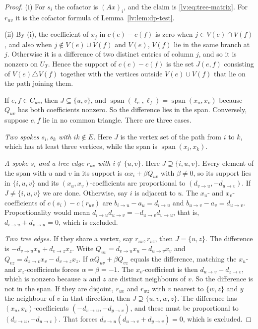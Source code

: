 \documentclass[11pt,a4paper]{article}
\theoremstyle{definition}
\theoremstyle{remark}
\begin{document}
\begin{proof}
(i) For $s_i$ the cofactor is $(Ax)_i$, and the claim is \eqref{lv:eq:tree-matrix}. For $r_{uv}$ it is the cofactor formula of Lemma~\ref{lv:lem:dp-test}.

(ii) By (i), the coefficient of $x_j$ in $c(e)-c(f)$ is zero when $j\in V(e)\cap V(f)$, and also when $j\notin V(e)\cup V(f)$ and $V(e)$, $V(f)$ lie in the same branch at $j$. Otherwise it is a difference of two distinct entries of column $j$, and so it is nonzero on $U_T$. Hence the support of $c(e)-c(f)$ is the set $J(e,f)$ consisting of $V(e)\triangle V(f)$ together with the vertices outside $V(e)\cup V(f)$ that lie on the path joining them.

If $e,f\in C_{uv}$, then $J\subseteq\{u,v\}$, and $\operatorname{span}(\ell_e,\ell_f)=\operatorname{span}(x_u,x_v)$ because $Q_{uv}$ has both coefficients nonzero. So the difference lies in the span. Conversely, suppose $e,f$ lie in no common triangle. There are three cases.

\emph{Two spokes $s_i,s_k$ with $ik\notin E$.} Here $J$ is the vertex set of the path from $i$ to $k$, which has at least three vertices, while the span is $\operatorname{span}(x_i,x_k)$.

\emph{A spoke $s_i$ and a tree edge $r_{uv}$ with $i\notin\{u,v\}$.} Here $J\supseteq\{i,u,v\}$. Every element of the span with $u$ and $v$ in its support is $\alpha x_i+\beta Q_{uv}$ with $\beta\neq0$, so its support lies in $\{i,u,v\}$ and its $(x_u,x_v)$-coefficients are proportional to $(d_{v\to u},-d_{u\to v})$. If $J\neq\{i,u,v\}$ we are done. Otherwise, say $i$ is adjacent to $u$. The $x_u$- and $x_v$-coefficients of $c(s_i)-c(r_{uv})$ are $b_{i\to u}-a_u=d_{i\to u}$ and $b_{u\to v}-a_v=d_{u\to v}$. Proportionality would mean $d_{i\to u}d_{u\to v}=-d_{u\to v}d_{v\to u}$, that is, $d_{i\to u}+d_{v\to u}=0$, which is excluded.

\emph{Two tree edges.} If they share a vertex, say $r_{uv},r_{vz}$, then $J=\{u,z\}$. The difference is $-d_{v\to u}x_u+d_{v\to z}x_z$. Write $Q_{uv}=d_{v\to u}x_u-d_{u\to v}x_v$ and $Q_{vz}=d_{z\to v}x_v-d_{v\to z}x_z$. If $\alpha Q_{uv}+\beta Q_{vz}$ equals the difference, matching the $x_u$- and $x_z$-coefficients forces $\alpha=\beta=-1$. The $x_v$-coefficient is then $d_{u\to v}-d_{z\to v}$, which is nonzero because $u$ and $z$ are distinct neighbours of $v$. So the difference is not in the span. If they are disjoint, $r_{uv}$ and $r_{wz}$ with $v$ nearest to $\{w,z\}$ and $y$ the neighbour of $v$ in that direction, then $J\supseteq\{u,v,w,z\}$. The difference has $(x_u,x_v)$-coefficients $(-d_{v\to u},-d_{y\to v})$, and these must be proportional to $(d_{v\to u},-d_{u\to v})$. That forces $d_{v\to u}(d_{u\to v}+d_{y\to v})=0$, which is excluded.
\end{proof}
\end{document}
